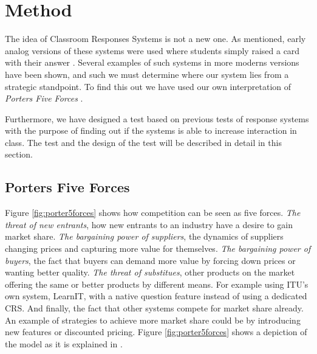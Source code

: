 \section{Method}



The idea of Classroom Responses Systems is not a new one. As mentioned, early analog versions of these systems were used where students simply raised a card with their answer \cite[p.~257]{stowell2007benefits}. Several examples of such systems in more moderns versions have been shown, and such we must determine where our system lies from a strategic standpoint. To find this out we have used our own interpretation of \emph{Porters Five Forces} \cite{porter1979competitive}.

Furthermore, we have designed a test based on previous tests of response systems with the purpose of finding out if the systems is able to increase interaction in class. The test and the design of the test will be described in detail in this section.


\subsection{Porters Five Forces}
Figure \ref{fig:porter5forces} shows how competition can be seen as five forces. 
\emph{The threat of new entrants}, how new entrants to an industry have a desire to gain market share. \emph{The bargaining power of suppliers}, the dynamics of suppliers changing prices and capturing more value for themselves. \emph{The bargaining power of buyers}, the fact that buyers can demand more value by forcing down prices or wanting better quality. \emph{The threat of substitues}, other products on the market offering the same or better products by different means. For example using ITU's own system, LearnIT, with a native question feature instead of using a dedicated CRS. And finally, the fact that other systems compete for market share already. An example of strategies to achieve more market share could be by introducing new features or discounted pricing. Figure \ref{fig:porter5forces} shows a depiction of the model as it is explained in .


